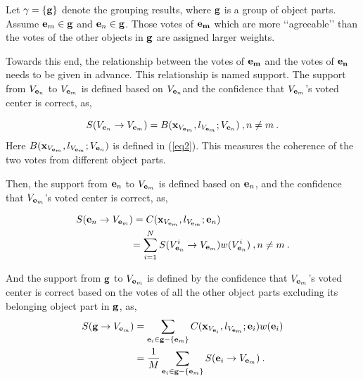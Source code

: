\documentclass{mva2011}
\begin{document}
Let $\gamma=\{\bf{g}\}$ denote the grouping results, where $\bf{g}$ is a group of object parts.  Assume ${{\bf{e}}_m}\in \bf{g}$ and ${{\bf{e}}_n}\in \bf{g}$. Those votes of ${\bf{e}_m}$ which are more {\lq\lq}agreeable{\rq\rq} than the votes of the other objects in $\bf{g}$ are assigned larger weights.

Towards this end, the relationship between the votes of $\bf{e}_m$ and the votes of $\bf{e}_n$ needs to be given in advance. This relationship is named support. The support from ${V_{{{\bf{e}}_n}}}$ to ${V_{{{\bf{e}}_m}}}$ is defined based on ${V_{{{\bf{e}}_n}}}$and the confidence that ${V_{{{\bf{e}}_m}}}$'s voted center is correct, as,


\[
S({V_{{{\bf{e}}_n}}} \to {V_{{{\bf{e}}_m}}})  =  B({\bf{x}}_{V_{{{\bf{e}}_m}}},l_{V_{{{\bf{e}}_m}}};{V_{{{\bf{e}}_n}}})\:,n \ne m\:.
\]
Here $B({\bf{x}}_{V_{{{\bf{e}}_m}}},l_{V_{{{\bf{e}}_m}}};{V_{{{\bf{e}}_n}}})$ is defined in (\ref{eq2}). This measures the coherence of the two votes from different object parts.

Then, the support from ${{\bf{e}}_n}$ to ${V_{{{\bf{e}}_m}}}$ is defined  based on ${{\bf{e}}_n}$, and the confidence that $V_{{{\bf{e}}_m}}$'s voted center is correct, as,

\[
\begin{aligned}
S({{{\bf{e}}_n} \to {V_{{{\bf{e}}_m}}}}) &= C({\bf{x}}_{V_{{{\bf{e}}_m}}},l_{V_{{{\bf{e}}_m}}};{{{\bf{e}}_n}})\\
& {
=\sum\limits^N_{i=1} {S({{V^i_{{{\bf{e}}_n}}} \to {V_{{{\bf{e}}_m}}}})w(V^i_{{\bf{e}}_n})}\:,n \ne m\:.
}
\end{aligned}
\]

And the support from ${\bf{g}}$ to $V_{{\bf{e}}_m}$ is defined by the confidence that $V_{{\bf{e}}_m}$'s voted center is correct based on the votes of all the other object parts excluding its belonging object part in $\bf{g}$, as,
\[
\begin{aligned}
S({\bf{g}} \to V_{{\bf{e}}_m})
&= \sum\limits_{{{\bf{e}}_i} \in {\bf{g}}- \{ {{\bf{e}}_m} \} }{C({\bf{x}}_{V_{{{\bf{e}}_i}}},l_{V_{{{\bf{e}}_m}}};{{{\bf{e}}_i}})w({{\bf{e}}_i})}\\
& =\frac 1 M  \sum\limits_{{{\bf{e}}_i} \in {\bf{g}}- \{ {{\bf{e}}_m} \}} {S({{{\bf{e}}_i} \to {V_{{{\bf{e}}_m}}}})} \:.
\end{aligned}
\]
\end{document}
